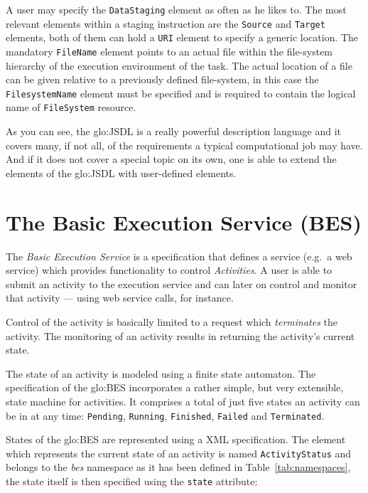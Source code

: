 A user may  specify the \texttt{DataStaging} element as  often as he likes
to.   The most  relevant elements  within  a staging  instruction are  the
\texttt{Source}  and \texttt{Target}  elements, both  of them  can  hold a
\texttt{URI}  element  to  specify  a  generic  location.   The  mandatory
\texttt{FileName} element points to  an actual file within the file-system
hierarchy of the execution environment of the task. The actual location of
a file can be given relative  to a previously defined file-system, in this
case the \texttt{FilesystemName} element must be specified and is required
to contain the logical name of \texttt{FileSystem} resource.

\bigskip

As  you can  see,  the  \gls{glo:JSDL} is  a  really powerful  description
language and  it covers many,  if not all,  of the requirements  a typical
computational job  may have. And if it  does not cover a  special topic on
its own,  one is able  to extend the  elements of the  \gls{glo:JSDL} with
user-defined elements.

\section[Basic Execution Service]{The Basic Execution Service (BES)}

The \emph{Basic Execution Service} \cite{ogsa-bes} is a specification that
defines  a service (e.g.~a  web service)  which provides  functionality to
control \emph{Activities}.   A user is able  to submit an  activity to the
execution service and  can later on control and  monitor that activity ---
using web service calls, for instance.

Control  of  the  activity  is   basically  limited  to  a  request  which
\emph{terminates} the  activity. The monitoring of an  activity results in
returning the activity's current state.

The state  of an activity is  modeled using a finite  state automaton. The
specification of the \gls{glo:BES}  incorporates a rather simple, but very
extensible, state  machine for  activities. It comprises  a total  of just
five  states  an  activity  can  be  in  at  any  time:  \texttt{Pending},
\texttt{Running},       \texttt{Finished},       \texttt{Failed}       and
\texttt{Terminated}.

States of the \gls{glo:BES} are represented using a XML specification. The
element  which  represents the  current  state  of  an activity  is  named
\texttt{ActivityStatus} and belongs to  the \emph{bes} namespace as it has
been  defined  in Table~\ref{tab:namespaces},  the  state  itself is  then
specified using the \texttt{state} attribute:

